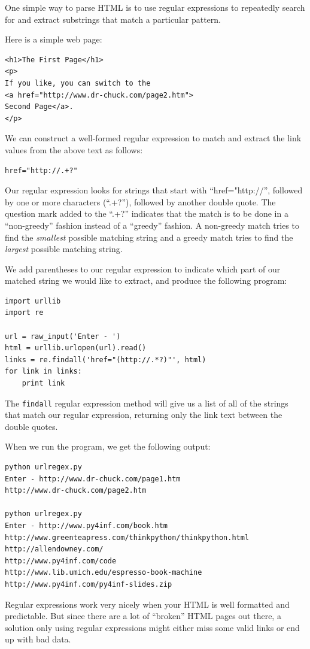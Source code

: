 One simple way to parse HTML is to use regular expressions to repeatedly
search for and extract substrings that match a particular pattern.

Here is a simple web page:

\beforeverb
\begin{verbatim}
<h1>The First Page</h1>
<p>
If you like, you can switch to the
<a href="http://www.dr-chuck.com/page2.htm">
Second Page</a>.
</p>
\end{verbatim}
\afterverb
%
We can construct a well-formed regular expression to match
and extract the link values from the above text as follows:

\beforeverb
\begin{verbatim}
href="http://.+?"
\end{verbatim}
\afterverb
%
Our regular expression looks for strings that start with
``href="http://'', followed by one or more characters
(``.+?''), followed by another double quote.  The question mark 
added to the ``.+?'' indicates that the match is to be done
in a ``non-greedy'' fashion instead of a ``greedy'' fashion.  
A non-greedy match tries to find the {\em smallest} possible matching
string and a greedy match tries to find the {\em largest} possible
matching string.

We add parentheses to our regular expression to indicate
which part of our matched string we would like to extract, and
produce the following program:

\beforeverb
\begin{verbatim}
import urllib
import re

url = raw_input('Enter - ')
html = urllib.urlopen(url).read()
links = re.findall('href="(http://.*?)"', html)
for link in links:
    print link
\end{verbatim}
\afterverb
%
The {\tt findall} regular expression method will give us a list of all
of the strings that match our regular expression, returning only
the link text between the double quotes.

When we run the program, we get the following output:

\beforeverb
\begin{verbatim}
python urlregex.py 
Enter - http://www.dr-chuck.com/page1.htm
http://www.dr-chuck.com/page2.htm

python urlregex.py 
Enter - http://www.py4inf.com/book.htm
http://www.greenteapress.com/thinkpython/thinkpython.html
http://allendowney.com/
http://www.py4inf.com/code
http://www.lib.umich.edu/espresso-book-machine
http://www.py4inf.com/py4inf-slides.zip
\end{verbatim}
\afterverb
%
Regular expressions work very nicely when your HTML is well formatted
and predictable.  But since there are a lot of ``broken'' HTML pages
out there, a solution only using regular expressions might either miss
some valid links or end up with bad data.

